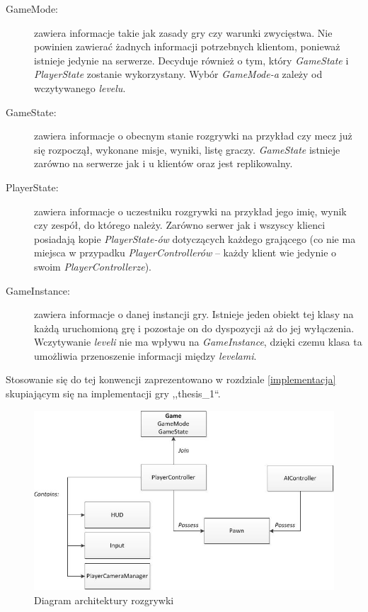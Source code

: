 \documentclass[multip]{SGGW-thesis}
\begin{document}
\begin{description}
\item[GameMode:] zawiera informacje takie jak zasady gry czy warunki zwycięstwa. Nie powinien zawierać żadnych informacji potrzebnych klientom, ponieważ istnieje jedynie na serwerze. Decyduje również o tym, który {\em GameState} i {\em PlayerState} zostanie wykorzystany. Wybór {\em GameMode-a} zależy od wczytywanego {\em levelu}.
\item[GameState:] zawiera informacje o obecnym stanie rozgrywki na przykład czy mecz już się rozpoczął, wykonane misje, wyniki, listę graczy. {\em GameState} istnieje zarówno na serwerze jak i u klientów oraz jest replikowalny.
\item[PlayerState:] zawiera informacje o uczestniku rozgrywki na przykład jego imię, wynik czy zespół, do którego należy. Zarówno serwer jak i wszyscy klienci posiadają kopie {\em PlayerState-ów} dotyczących każdego grającego (co nie ma miejsca w przypadku {\em PlayerControllerów} -- każdy klient wie jedynie o swoim {\em PlayerControllerze}).
\item[GameInstance:] zawiera informacje o danej instancji gry. Istnieje jeden obiekt tej klasy na każdą uruchomioną grę i pozostaje on do dyspozycji aż do jej wyłączenia. Wczytywanie {\em leveli} nie ma wpływu na {\em GameInstance}, dzięki czemu klasa ta umożliwia przenoszenie informacji między {\em levelami}.
\end{description}
Stosowanie się do tej konwencji zaprezentowano w rozdziale \ref{implementacja} skupiającym się na implementacji gry ,,thesis\_1``.

\begin{figure}
	\centering
		\includegraphics[width=1\textwidth]{figures/gameplay_chart.jpg}
	\caption{Diagram architektury rozgrywki}
	\label{fig-gameplay-chart}
\end{figure}
\end{document}
